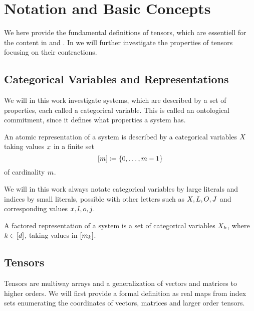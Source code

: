 \section{Notation and Basic Concepts}\label{cha:TensorNetworks}

We here provide the fundamental definitions of tensors, which are essentiell for the content in  and .
In  we will further investigate the properties of tensors focusing on their contractions.

\subsection{Categorical Variables and Representations}

We will in this work investigate systems, which are described by a set of properties, each called a categorical variable. 
This is called an ontological commitment, since it defines what properties a system has.

\begin{definition}
	An atomic representation of a system is described by a categorical variables $X$ taking values $x$ in a finite set 
		\[  [m]\coloneqq \{0,\ldots, m-1\} \]
	of cardinality $m$.
\end{definition}

We will in this work always notate categorical variables by large literals and indices by small literals, possible with other letters such as $X,L,O,J$ and corresponding values $x,l,o,j$.

\begin{definition}
	A factored representation of a system is a set of categorical variables $X_{k}$, where $k\in[d]$, taking values in $[m_{k}]$.
\end{definition}

\subsection{Tensors}

Tensors are multiway arrays and a generalization of vectors and matrices to higher orders.
We will first provide a formal definition as real maps from index sets enumerating the coordinates of vectors, matrices and larger order tensors.

